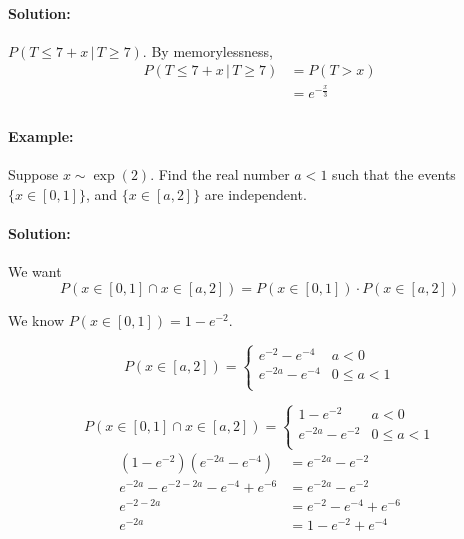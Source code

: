 \documentclass[letterpaper,12pt]{article}
\begin{document}
\paragraph{Solution:} $P(T \le 7+x \,|\, T \ge 7)$.
By memorylessness,
\begin{align*}
    P(T \le 7+x \,|\, T \ge 7) &= P(T > x)\\
                               &= e^{-\frac{x}{3}}\\
\end{align*}

\paragraph{Example:} Suppose $x \sim \exp(2)$. Find the real number $a < 1$ such that
the events $\{x \in [0,1]\}$, and $\{x \in [a,2]\}$ are independent.
\paragraph{Solution:} We want
\[
    P(x \in [0,1] \cap x \in [a,2]) = P(x\in[0,1]) \cdot P(x \in [a,2]) 
\]


We know $P(x \in [0,1]) = 1-e^{-2}$.


\[
    P(x \in [a,2]) = \begin{cases}
        e^{-2} - e^{-4} & a < 0 \\
        e^{-2a} - e^{-4} & 0 \le a < 1\\
        \end{cases}
\]

\[
    P(x \in [0,1] \cap x \in [a,2]) = \begin{cases}
        1-e^{-2} & a < 0\\
        e^{-2a} - e^{-2} & 0 \le a < 1\\
    \end{cases}
\]
\begin{align*}
    (1-e^{-2})(e^{-2a}-e^{-4}) &= e^{-2a} - e^{-2}\\
    e^{-2a} - e^{-2-2a}-e^{-4}+e^{-6} &= e^{-2a} - e^{-2}\\
    e^{-2-2a} &= e^{-2}-e^{-4}+e^{-6}\\
    e^{-2a} &= 1-e^{-2}+e^{-4}\\
\end{align*}
\end{document}

